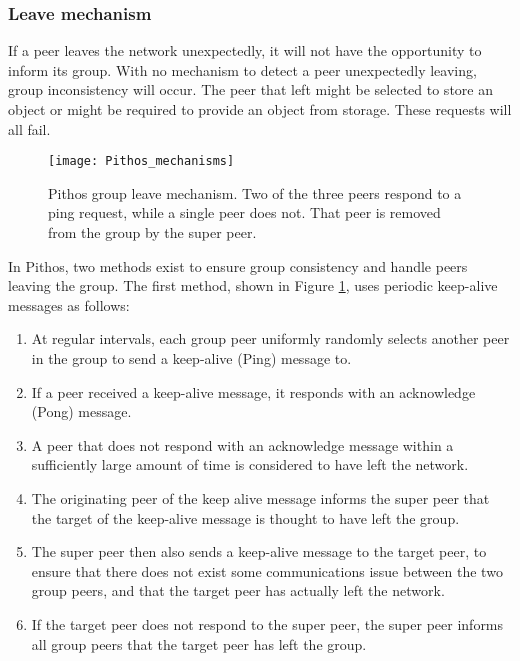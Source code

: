 \subsubsection{Leave mechanism}
\label{leave_design}

If a peer leaves the network unexpectedly, it will not have the opportunity to inform its group. With no mechanism to detect a peer unexpectedly leaving, group inconsistency will occur. The peer that left might be selected to store an object or might be required to provide an object from storage. These requests will all fail.

\begin{figure}[htbp]
 \centering
 \texttt{[image: Pithos\_mechanisms]}
 \caption{Pithos group leave mechanism. Two of the three peers respond to a ping request, while a single peer does not. That peer is removed from the group by the super peer.}
 \label{fig_pithos_leave}
\end{figure}

In Pithos, two methods exist to ensure group consistency and handle peers leaving the group. The first method, shown in Figure \ref{fig_pithos_leave}, uses periodic keep-alive messages as follows:
%
\begin{enumerate}
\item At regular intervals, each group peer uniformly randomly selects another peer in the group to send a keep-alive (Ping) message to.

\item If a peer received a keep-alive message, it responds with an acknowledge (Pong) message.

\item A peer that does not respond with an acknowledge message within a sufficiently large amount of time is considered to have left the network.

\item The originating peer of the keep alive message informs the super peer that the target of the keep-alive message is thought to have left the group.

\item The super peer then also sends a keep-alive message to the target peer, to ensure that there does not exist some communications issue between the two group peers, and that the target peer has actually left the network.

\item If the target peer does not respond to the super peer, the super peer informs all group peers that the target peer has left the group.
\end{enumerate}

